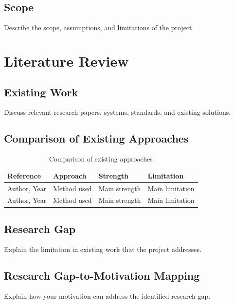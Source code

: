 \documentclass[12pt,a4paper]{report}
\begin{document}
\section{Scope}
Describe the scope, assumptions, and limitations of the project.

\chapter{Literature Review}

\section{Existing Work}
Discuss relevant research papers, systems, standards, and existing solutions.

\section{Comparison of Existing Approaches}

\begin{table}[h]
\centering
\caption{Comparison of existing approaches}
\begin{tabular}{@{}p{3cm}p{4cm}p{3cm}p{3cm}@{}}
\toprule
\textbf{Reference} & \textbf{Approach} & \textbf{Strength} &
\textbf{Limitation}\\
\midrule
Author, Year & Method used & Main strength & Main limitation\\
Author, Year & Method used & Main strength & Main limitation\\
\bottomrule
\end{tabular}
\end{table}

\section{Research Gap}
Explain the limitation in existing work that the project addresses.

\section{Research Gap-to-Motivation Mapping}
Explain how your motivation can address the identified research gap.
\end{document}
